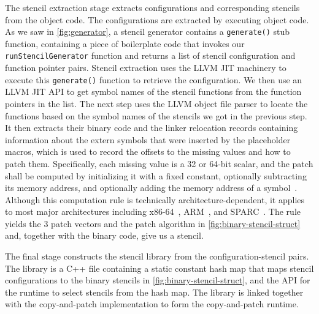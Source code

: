 \documentclass[acmsmall,nonacm,screen]{acmart}\settopmatter{printfolios=true,printccs=true,printacmref=false}
\newcommand{\figref}[1]{\autoref{#1}}
\newcommand\code[1]{\lstinline[mathescape=true,basicstyle=\ttfamily\normalsize]|#1|}
\newcommand{\cp}{copy-and-patch}
\begin{document}
The stencil extraction stage extracts configurations and corresponding stencils from the object code. The configurations are extracted by executing object code. As we saw in \figref{fig:generator}, a stencil generator contains a \code{generate()} stub function, containing a piece of boilerplate code that invokes our \code{runStencilGenerator} function and returns a list of stencil configuration and function pointer pairs. Stencil extraction uses the LLVM JIT machinery to execute this \code{generate()} function to retrieve the configuration. We then use an LLVM JIT API to get symbol names of the stencil functions from the function pointers in the list. The next step uses the LLVM object file parser to locate the functions based on the symbol names of the stencils we got in the previous step. It then extracts their binary code and the linker relocation records containing information about the extern symbols that were inserted by the placeholder macros, which is used to record the offsets to the missing values and how to patch them. Specifically, each missing value is a 32 or 64-bit scalar, and the patch shall be computed by initializing it with a fixed constant, optionally subtracting its memory address, and optionally adding the memory address of a symbol~\cite{systemvABI}. Although this computation rule is technically architecture-dependent, it applies to most major architectures including x86-64~\cite{systemvABI}, ARM~\cite{armRelocationTypes}, and SPARC~\cite{sparcRelocationTypes}. The rule yields the 3 patch vectors and the patch algorithm in \figref{fig:binary-stencil-struct} and, together with the binary code, give us a stencil.

The final stage constructs the stencil library from the configuration-stencil pairs. The library is a C++ file containing a static constant hash map that maps stencil configurations to the binary stencils in \figref{fig:binary-stencil-struct}, and the API for the runtime to select stencils from the hash map. The library is linked together with the \cp{} implementation to form the \cp{} runtime.
\end{document}
